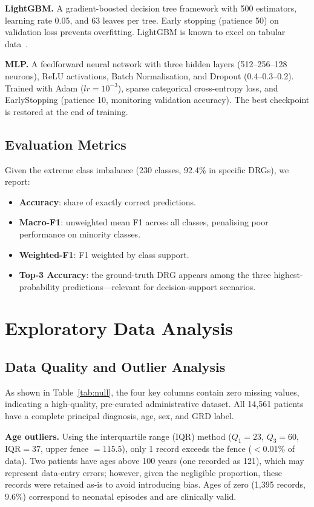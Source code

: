 \documentclass{IEEEtran}
\begin{document}
\textbf{LightGBM.}  A gradient-boosted decision tree framework
with 500 estimators, learning rate 0.05, and 63 leaves per tree.
Early stopping (patience 50) on validation loss prevents overfitting.
LightGBM is known to excel on tabular data~\cite{ke2017lightgbm}.

\textbf{MLP.}  A feedforward neural network with three hidden layers
(512–256–128 neurons), ReLU activations, Batch Normalisation,
and Dropout (0.4–0.3–0.2).  Trained with Adam ($lr{=}10^{-3}$),
sparse categorical cross-entropy loss, and EarlyStopping
(patience 10, monitoring validation accuracy).
The best checkpoint is restored at the end of training.

\subsection{Evaluation Metrics}

Given the extreme class imbalance (230 classes, 92.4\% in specific
DRGs), we report:
\begin{itemize}
  \item \textbf{Accuracy}: share of exactly correct predictions.
  \item \textbf{Macro-F1}: unweighted mean F1 across all classes,
        penalising poor performance on minority classes.
  \item \textbf{Weighted-F1}: F1 weighted by class support.
  \item \textbf{Top-3 Accuracy}: the ground-truth DRG appears among
        the three highest-probability predictions—relevant for
        decision-support scenarios.
\end{itemize}

\section{Exploratory Data Analysis}

\subsection{Data Quality and Outlier Analysis}

As shown in Table~\ref{tab:null}, the four key columns contain
zero missing values, indicating a high-quality, pre-curated
administrative dataset.
All 14{,}561 patients have a complete principal diagnosis, age,
sex, and GRD label.

\textbf{Age outliers.}
Using the interquartile range (IQR) method
($Q_1{=}23$, $Q_3{=}60$, $\mathrm{IQR}{=}37$,
upper fence $= 115.5$), only 1 record exceeds the fence
($<$0.01\% of data).
Two patients have ages above 100 years (one recorded as 121),
which may represent data-entry errors; however, given the
negligible proportion, these records were retained as-is
to avoid introducing bias.
Ages of zero (1{,}395 records, 9.6\%) correspond to
neonatal episodes and are clinically valid.
\end{document}
